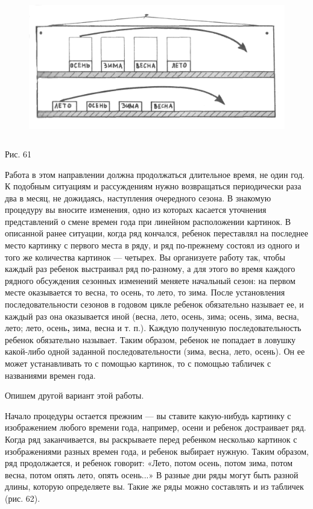 \documentclass[a5paper]{book}
\begin{document}
\begin{figure}
\centering
\includegraphics[width=4.96667in,height=2.42014in]{media/media/image58.jpg}
\end{figure}

Рис. 61

Работа в этом направлении должна продолжаться длительное время, не один
год. К подобным ситуациям и рассуждениям нужно возвращаться периодически
раза два в месяц, не дожидаясь, наступления очередного сезона. В
знакомую процедуру вы вносите изменения, одно из которых касается
уточнения представлений о смене времен года при линейном расположении
картинок. В описанной ранее ситуации, когда ряд кончался, ребенок
переставлял на последнее место картинку с первого места в ряду, и ряд
по-прежнему состоял из одного и того же количества картинок --- четырех.
Вы организуете работу так, чтобы каждый раз ребенок выстраивал ряд
по-разному, а для этого во время каждого рядного обсуждения сезонных
изменений меняете начальный сезон: на первом месте оказывается то весна,
то осень, то лето, то зима. После установления последовательности
сезонов в годовом цикле ребенок обязательно называет ее, и каждый раз
она оказывается иной (весна, лето, осень, зима; осень, зима, весна,
лето; лето, осень\textbf{,} зима, весна и т. п.). Каждую полученную
последовательность ребенок обязательно называет. Таким образом, ребенок
не попадает в ловушку какой-либо одной заданной последовательности
(зима, весна, лето, осень). Он ее может устанавливать то с помощью
картинок, то с помощью табличек с названиями времен года.

Опишем другой вариант этой работы.

Начало процедуры остается прежним --- вы ставите какую-нибудь картинку с
изображением любого времени года, например, осени и ребенок достраивает
ряд. Когда ряд заканчивается, вы раскрываете перед ребенком несколько
картинок с изображениями разных времен года, и ребенок выбирает нужную.
Таким образом, ряд продолжается, и ребенок говорит: «Лето, потом осень,
потом зима, потом весна, потом опять лето, опять осень...» В разные дни
ряды могут быть разной длины, которую определяете вы. Такие же ряды
можно составлять и из табличек (рис. 62).
\end{document}
